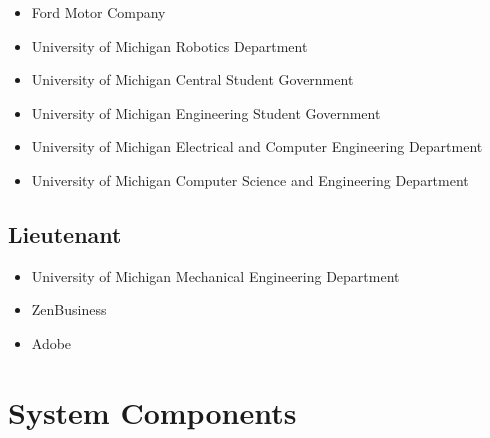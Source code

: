 \documentclass[conference]{IEEEtran}
\begin{document}
\begin{itemize}
    \item Ford Motor Company
    \item University of Michigan Robotics Department
    \item University of Michigan Central Student Government
    \item University of Michigan Engineering Student Government
    \item University of Michigan Electrical and Computer Engineering Department
    \item University of Michigan Computer Science and Engineering Department
\end{itemize}

\subsection{Lieutenant}
\label{ssec:lieutenant_sponsors}
\par
\begin{itemize}
    \item University of Michigan Mechanical Engineering Department
    \item ZenBusiness
    \item Adobe
\end{itemize}

\newpage
\clearpage




\section{System Components}
\label{sec:system_components}
\end{document}
